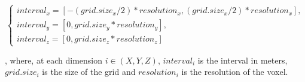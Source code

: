 \begin{equation}\label{eq:cp05_filter_limits}
\begin{cases}
interval_x = [-(grid.size_x / 2) * resolution_x, (grid.size_x / 2) * resolution_x ], \\
interval_y = [0, grid.size_y * resolution_y ], \\
interval_z = [0, grid.size_z * resolution_z ]
\end{cases}
\end{equation}

, where, at each dimension $i \in (X,Y,Z)$, $interval_i$ is the interval in meters, $grid.size_i$ is the size of the grid and $resolution_i$ is the resolution of the voxel.

